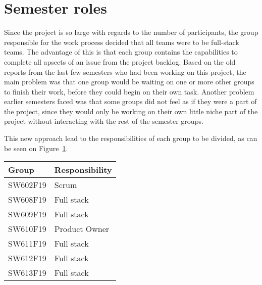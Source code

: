 \section{Semester roles}
Since the project is so large with regards to the number of participants, the group responsible for the work process decided that all teams were to be full-stack teams.
The advantage of this is that each group contains the capabilities to complete all apsects of an issue from the project backlog.
Based on the old reports from the last few semesters who had been working on this project, the main problem was that one group would be waiting on one or more other groups to finish their work, before they could begin on their own task.
Another problem earlier semesters faced was that some groups did not feel as if they were a part of the project, since they would only be working on their own little niche part of the project without interacting with the rest of the semester groups.

This new approach lead to the responsibilities of each group to be divided, as can be seen on Figure~\ref{TBL:GroupResponsibility}.
\begin{table}[H]
\centering
\begin{tabular}{|l|l|}
\hline
\textbf{Group} & \textbf{Responsibility} \\ \hline
SW602F19 & Scrum\\ \hline
SW608F19 & Full stack\\ \hline
SW609F19 & Full stack\\ \hline
SW610F19 & Product Owner  \\ \hline
SW611F19 & Full stack \\ \hline
SW612F19 & Full stack \\ \hline
SW613F19 & Full stack \\ \hline
\end{tabular}
\label{TBL:GroupResponsibility}
\end{table}
